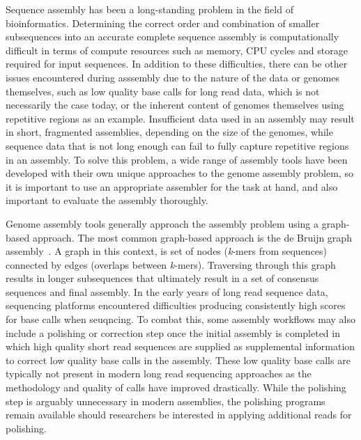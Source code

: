 Sequence assembly has been a long-standing problem in the field of
bioinformatics\cite{Nagarajan2013}. Determining the correct order and
combination of smaller subsequences into an accurate complete sequence
assembly is computationally difficult in terms of compute resources
such as memory, CPU cycles and storage required for input
sequences\cite{Nagarajan2013}. In addition to these difficulties,
there can be other issues encountered during asssembly due to the
nature of the data or genomes themselves, such as low quality base
calls for long read data, which is not necessarily the case today, or
the inherent content of genomes themselves using repetitive regions as
an example. Insufficient data used in an assembly may result in short,
fragmented assemblies, depending on the size of the genomes, while
sequence data that is not long enough can fail to fully capture
repetitive regions in an assembly. To solve this problem, a wide range
of assembly tools have been developed with their own unique approaches
to the genome assembly problem, so it is important to use an
appropriate assembler for the task at hand, and also important to
evaluate the assembly thoroughly.

Genome assembly tools generally approach the assembly problem using a
graph-based approach. The most common graph-based approach is the de
Bruijn graph assembly~\cite{Compeau2011}. A graph in this context, is
set of nodes (\textit{k}-mers from sequences) connected by edges
(overlaps between \textit{k}-mers). Traversing through this graph
results in longer subsequences that ultimately result in a set of
consensus sequences and final assembly. In the early years of long
read sequence data, sequencing platforms encountered difficulties
producing consistently high scores for base calls when seuqncing. To
combat this, some assembly workflows may also include a polishing or
correction step once the initial assembly is completed in which high
quality short read sequences are supplied as supplemental information
to correct low quality base calls in the assembly. These low quality
base calls are typically not present in modern long read sequencing
approaches as the methodology and quality of calls have improved
drastically. While the polishing step is arguably unnecessary in
modern assemblies, the polishing programs remain available should
researchers be interested in applying additional reads for polishing.

